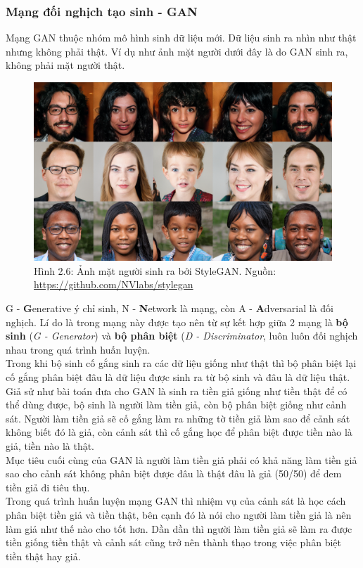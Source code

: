 \documentclass[a4paper]{article}
\begin{document}
\subsubsection{Mạng đối nghịch tạo sinh - GAN}
Mạng GAN thuộc nhóm mô hình sinh dữ liệu mới. Dữ liệu sinh ra nhìn như thật nhưng không phải thật. Ví dụ như ảnh mặt người dưới đây là do GAN sinh ra, không phải mặt người thật.

\begin{figure}[h!]
\centering
\includegraphics[width=13cm]{images/2_6.PNG}
\caption{Hình 2.6: Ảnh mặt người sinh ra bởi StyleGAN. Nguồn: \href{https://github.com/NVlabs/stylegan}{https://github.com/NVlabs/stylegan}}
\end{figure}

\noindent
G - \textbf{G}enerative ý chỉ sinh, N - \textbf{N}etwork là mạng, còn A - \textbf{A}dversarial là đối nghịch. Lí do là trong mạng này được tạo nên từ sự kết hợp giữa 2 mạng là \textbf{bộ sinh} (\textit{G - Generator}) và \textbf{bộ phân biệt} (\textit{D - Discriminator}, luôn luôn đối nghịch nhau trong quá trình huấn luyện.\\
Trong khi bộ sinh cố gắng sinh ra các dữ liệu giống như thật thì bộ phân biệt lại cố gắng phân biệt đâu là dữ liệu được sinh ra từ bộ sinh và đâu là dữ liệu thật.\\

\noindent
Giả sử như bài toán đưa cho GAN là sinh ra tiền giả giống như tiền thật để có thể dùng được, bộ sinh là người làm tiền giả, còn bộ phân biệt giống như cảnh sát. Người làm tiền giả sẽ cố gắng làm ra những tờ tiền giả làm sao để cảnh sát không biết đó là giả, còn cảnh sát thì cố gắng học để phân biệt được tiền nào là giả, tiền nào là thật.\\
Mục tiêu cuối cùng của GAN là người làm tiền giả phải có khả năng làm tiền giả sao cho cảnh sát không phân biệt được đâu là thật đâu là giả (50/50) để đem tiền giả đi tiêu thụ.\\
Trong quá trình huấn luyện mạng GAN thì nhiệm vụ của cảnh sát là học cách phân biệt tiền giả và tiền thật, bên cạnh đó là nói cho người làm tiền giả là nên làm giả như thế nào cho tốt hơn. Dần dần thì người làm tiền giả sẽ làm ra được tiền giống tiền thật và cảnh sát cũng trở nên thành thạo trong việc phân biệt tiền thật hay giả.\\
\end{document}
